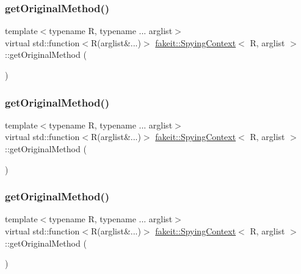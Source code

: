 \subsubsection{\texorpdfstring{getOriginalMethod()}{getOriginalMethod()}\hspace{0.1cm}{\footnotesize\ttfamily [4/9]}}
{\footnotesize\ttfamily template$<$typename R, typename ... arglist$>$ \\
virtual std\+::function$<$R(arglist\&...)$>$ \mbox{\hyperlink{structfakeit_1_1SpyingContext}{fakeit\+::\+Spying\+Context}}$<$ R, arglist $>$\+::get\+Original\+Method (\begin{DoxyParamCaption}{ }\end{DoxyParamCaption})\hspace{0.3cm}{\ttfamily [pure virtual]}}

\mbox{\label{structfakeit_1_1SpyingContext_ad93f55614a19d084778f2ca96aca8037}} 
\subsubsection{\texorpdfstring{getOriginalMethod()}{getOriginalMethod()}\hspace{0.1cm}{\footnotesize\ttfamily [5/9]}}
{\footnotesize\ttfamily template$<$typename R, typename ... arglist$>$ \\
virtual std\+::function$<$R(arglist\&...)$>$ \mbox{\hyperlink{structfakeit_1_1SpyingContext}{fakeit\+::\+Spying\+Context}}$<$ R, arglist $>$\+::get\+Original\+Method (\begin{DoxyParamCaption}{ }\end{DoxyParamCaption})\hspace{0.3cm}{\ttfamily [pure virtual]}}

\mbox{\label{structfakeit_1_1SpyingContext_ad93f55614a19d084778f2ca96aca8037}} 
\subsubsection{\texorpdfstring{getOriginalMethod()}{getOriginalMethod()}\hspace{0.1cm}{\footnotesize\ttfamily [6/9]}}
{\footnotesize\ttfamily template$<$typename R, typename ... arglist$>$ \\
virtual std\+::function$<$R(arglist\&...)$>$ \mbox{\hyperlink{structfakeit_1_1SpyingContext}{fakeit\+::\+Spying\+Context}}$<$ R, arglist $>$\+::get\+Original\+Method (\begin{DoxyParamCaption}{ }\end{DoxyParamCaption})\hspace{0.3cm}{\ttfamily [pure virtual]}}


